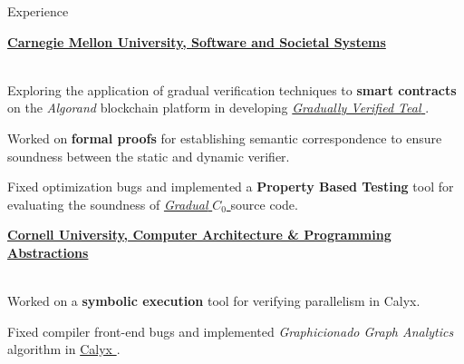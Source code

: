 \begin{rSection}{Experience}
	{\textbf{\large{\href{https://www.cmu.edu/scs/s3d/reuse/}{Carnegie Mellon University, Software and Societal Systems \ExternalLink}}} \hfill \color{darkgray}{06/2022 - Present} 
	\\ \vspace*{1mm}
	 \hfill \color{darkgray}{Pittsburgh, PA} 
	\\ 
	\color{black}
	\begin{minipage}{40em}
		\color{black}Exploring the application of gradual verification techniques to \textbf{smart contracts} on the \textit{Algorand} blockchain platform in developing \href{https://github.com/gradual-verification/gradual-TEAL}{\textit{Gradually Verified Teal \ExternalLink}}.

		\color{black}Worked on \textbf{formal proofs} for establishing semantic correspondence to ensure soundness between the static and dynamic verifier.

		\color{black}Fixed optimization bugs and implemented a \textbf{Property Based Testing} tool for evaluating the soundness of \href{https://github.com/gradual-verification/gvc0}{\textit{Gradual} $C_0$ \ExternalLink} source code.
	\end{minipage}}

	{\textbf{\large{\href{https://capra.cs.cornell.edu/}{Cornell University, Computer Architecture \& Programming Abstractions \ExternalLink}}} \hfill \color{darkgray}{10/2021 - 12/2022} 
	\\ \vspace*{1mm}
	 \hfill \color{darkgray}{Ithaca, NY}
	\\
	\color{black}
	\begin{minipage}{40em}
		\color{black} Worked on a \textbf{symbolic execution} tool for verifying parallelism in Calyx.

		\color{black} Fixed compiler front-end bugs and implemented \textit{Graphicionado Graph Analytics} algorithm in \href{https://docs.calyxir.org/contributors.html}{Calyx \ExternalLink}.
	\end{minipage}} 

\end{rSection} 
